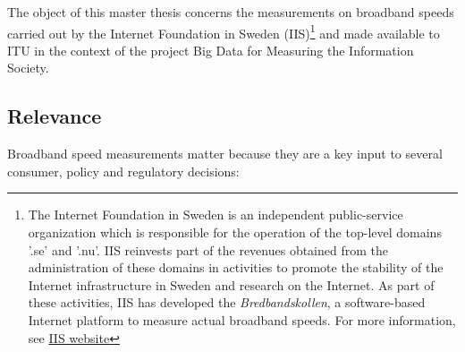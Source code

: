 \documentclass[12pt]{article}
\begin{document}
The object of this master thesis concerns the measurements on broadband speeds carried out by the Internet Foundation in Sweden (IIS)\footnote{The Internet Foundation in Sweden is an independent public-service organization which is responsible for the operation of the top-level domains '.se' and '.nu'. IIS reinvests part of the revenues obtained from the administration of these domains in activities to promote the stability of the Internet infrastructure in Sweden and research on the Internet. As part of these activities, IIS has developed the \textit{Bredbandskollen}, a software-based Internet platform to measure actual broadband speeds. For more information, see \href{https://www.iis.se/english/what-we-do/}{IIS website}} and made available to ITU in the context of the project Big Data for Measuring the Information Society.    

\subsection{Relevance}
Broadband speed measurements matter because they are a key input to several consumer, policy and regulatory decisions:
\end{document}
